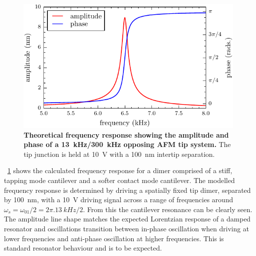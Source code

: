 \documentclass{article}
\begin{document}
\begin{figure}[bt]
\centering
\includegraphics{figures/afm_theory_frequency_response}
\caption[Theoretical frequency response showing the amplitude and phase of a \SI{13}{kHz}/\SI{300}{kHz} opposing AFM tip system]{\textbf{Theoretical frequency response showing the amplitude and phase of a \SI{13}{kHz}/\SI{300}{kHz} opposing AFM tip system.} The tip junction is held at \SI{10}{V} with a \SI{100}{nm} intertip separation.}
\label{fig:num_freq_resp}
\end{figure}

\figurename~\ref{fig:num_freq_resp} shows the calculated frequency response for a dimer comprised of a stiff, tapping mode cantilever and a softer contact mode cantilever. The modelled frequency response is determined by driving a spatially fixed tip dimer, separated by \SI{100}{nm}, with a \SI{10}{V} driving signal across a range of frequencies around $\omega_s = \omega_{01}/2 = 2\pi.\SI{13}{kHz}/2$. From this the cantilever resonance can be clearly seen. The amplitude line shape matches the expected Lorentzian response of a damped resonator and oscillations transition between in-phase oscillation when driving at lower frequencies and anti-phase oscillation at higher frequencies. This is standard resonator behaviour and is to be expected.
\end{document}
